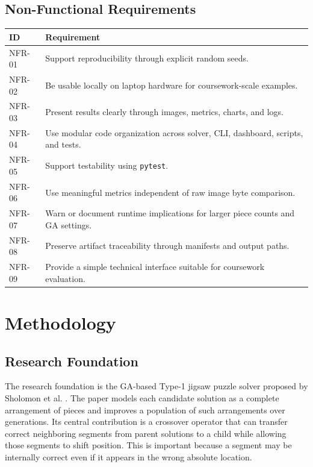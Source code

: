 \documentclass[12pt,a4paper]{article}
\begin{document}
\subsection{Non-Functional Requirements}
\begin{longtable}{>{\raggedright\arraybackslash}p{}>{\raggedright\arraybackslash}p{}}
\toprule
\textbf{ID} & \textbf{Requirement} \\
\midrule
NFR-01 & Support reproducibility through explicit random seeds. \\
NFR-02 & Be usable locally on laptop hardware for coursework-scale examples. \\
NFR-03 & Present results clearly through images, metrics, charts, and logs. \\
NFR-04 & Use modular code organization across solver, CLI, dashboard, scripts, and tests. \\
NFR-05 & Support testability using \texttt{pytest}. \\
NFR-06 & Use meaningful metrics independent of raw image byte comparison. \\
NFR-07 & Warn or document runtime implications for larger piece counts and GA settings. \\
NFR-08 & Preserve artifact traceability through manifests and output paths. \\
NFR-09 & Provide a simple technical interface suitable for coursework evaluation. \\
\bottomrule
\end{longtable}

\section{Methodology}
\subsection{Research Foundation}
The research foundation is the GA-based Type-1 jigsaw puzzle solver proposed by Sholomon et al. \cite{sholomon2016automatic}. The paper models each candidate solution as a complete arrangement of pieces and improves a population of such arrangements over generations. Its central contribution is a crossover operator that can transfer correct neighboring segments from parent solutions to a child while allowing those segments to shift position. This is important because a segment may be internally correct even if it appears in the wrong absolute location.
\end{document}
